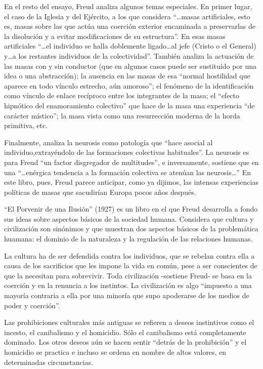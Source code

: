 \documentclass[
]{book}
\begin{document}
En el resto del ensayo, Freud analiza algunos temas especiales. En primer lugar, el caso de la Iglesia y del Ejército, a los que considera ``\ldots masas artificiales, esto es, masas sobre las que actúa una coerción exterior encaminada a preservarlas de la disolución y a evitar modificaciones de su estructura''. En esas masas artificiales ``\ldots el individuo se halla doblemente ligado\ldots al jefe (Cristo o el General) y\ldots a los restantes individuos de la colectividad''. También analiza la actuación de las masas con y sin conductor (que en algunos casos puede ser sustituído por una idea o una abstracción); la ausencia en las masas de esa ``normal hostilidad que aparece en todo vínculo estrecho, aún amoroso''; el fenómeno de la identificación como vínculo de enlace recíproco entre los integrantes de la masa; el ``efecto hipnótico del enamoramiento colectivo'' que hace de la masa una experiencia ``de carácter místico''; la masa vista como una resurrección moderna de la horda primitiva, etc.

Finalmente, analiza la neurosis como patología que ``hace asocial al individuo,extrayéndolo de las formaciones colectivas habituales''. La neurosis es para Freud ``un factor disgregador de multitudes'', e inversamente, sostiene que en una ``\ldots enérgica tendencia a la formación colectiva se atenúan las neurosis\ldots{}'' En este libro, pues, Freud parece anticipar, como ya dijimos, las intensas experiencias políticas de masas que sacudirían Europa pocos años después.

``El Porvenir de una Ilusión'' (1927) es un libro en el que Freud desarrolla a fondo sus ideas sobre aspectos básicos de la sociedad humana. Considera que cultura y civilización son sinónimos y que muestran dos aspectos básicos de la problemática huamana: el dominio de la naturaleza y la regulación de las relaciones humanas.

La cultura ha de ser defendida contra los individuos, que se rebelan contra ella a causa de los sacrificios que les impone la vida en común, pese a ser conscientes de que la necesitan para sobrevivir. Toda civilización -sostiene Freud- se basa en la coerción y en la renuncia a los instintos. La civilización es algo ``impuesto a una mayoría contraria a ella por una minoría que supo apoderarse de los medios de poder y coerción''.

Las prohibiciones culturales más antiguas se refieren a deseos instintivos como el incesto, el canibalismo y el homicidio. Sólo el canibalismo está completamente dominado. Los otros deseos aún se hacen sentir ``detrás de la prohibición'' y el homicidio se practica e incluso se ordena en nombre de altos valores, en determinadas circunstancias.
\end{document}
